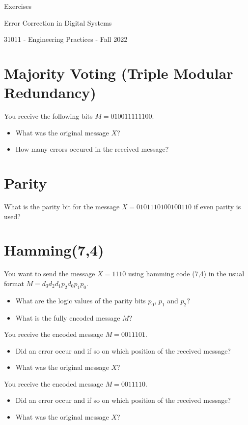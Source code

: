 \documentclass[a4paper]{article}
\begin{document}
    
\begin{center}
    {\LARGE Exercises\par}
    {\Large Error Correction in Digital Systems\par}
    {\large 31011 - Engineering Practices - Fall 2022\par}
\end{center}

\section{Majority Voting (Triple Modular Redundancy)}
You receive the following bits $M=010011111100$.
\begin{itemize}
    \item What was the original message $X$?
    \item How many errors occured in the received message?
\end{itemize} 

\section{Parity}
What is the parity bit for the message $X=0101110100100110$ if even parity is used?

\section{Hamming(7,4)}


You want to send the message $X=1110$ using hamming code (7,4) in the usual format $M=d_3d_2d_1p_2d_0p_1p_0$.
\begin{itemize}
    \item What are the logic values of the parity bits $p_0$, $p_1$ and $p_2$?
    \item What is the fully encoded message $M$?
\end{itemize}


\noindent You receive the encoded message $M=0011101$.
\begin{itemize}
    \item Did an error occur and if so on which position of the received message?
    \item What was the original message $X$?
\end{itemize}

\noindent You receive the encoded message $M=0011110$.
\begin{itemize}
    \item Did an error occur and if so on which position of the received message?
    \item What was the original message $X$?
\end{itemize}
\end{document}

